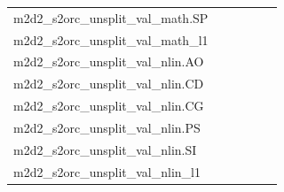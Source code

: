 \documentclass[dvipsnames]{article}
\begin{document}
\begin{appendix}
{\begin{longtable}{m{6cm}m{1.7cm}m{1.7cm}m{1.7cm}m{1.7cm}m{1.7cm}}
	m2d2\_s2orc\_unsplit\_val\_math.SP  & \colorbox[HTML]{86cc7e}{\makebox[\mywidth][c]{9.39}} & \colorbox[HTML]{def2a6}{\makebox[\mywidth][c]{9.65}} & \colorbox[HTML]{ffffe5}{\makebox[\mywidth][c]{11.27}} & \colorbox[HTML]{bbe395}{\makebox[\mywidth][c]{9.52}} & \colorbox[HTML]{77c578}{\makebox[\mywidth][c]{9.37}}\\
	m2d2\_s2orc\_unsplit\_val\_math\_l1  & \colorbox[HTML]{77c578}{\makebox[\mywidth][c]{7.81}} & \colorbox[HTML]{e5f4ab}{\makebox[\mywidth][c]{8.07}} & \colorbox[HTML]{ffffe5}{\makebox[\mywidth][c]{9.36}} & \colorbox[HTML]{d0ec9e}{\makebox[\mywidth][c]{7.99}} & \colorbox[HTML]{9ad486}{\makebox[\mywidth][c]{7.87}}\\
	m2d2\_s2orc\_unsplit\_val\_nlin.AO  & \colorbox[HTML]{9bd587}{\makebox[\mywidth][c]{11.82}} & \colorbox[HTML]{d8efa2}{\makebox[\mywidth][c]{12.01}} & \colorbox[HTML]{ffffe5}{\makebox[\mywidth][c]{13.77}} & \colorbox[HTML]{bbe395}{\makebox[\mywidth][c]{11.90}} & \colorbox[HTML]{77c578}{\makebox[\mywidth][c]{11.75}}\\
	m2d2\_s2orc\_unsplit\_val\_nlin.CD  & \colorbox[HTML]{addd8e}{\makebox[\mywidth][c]{12.73}} & \colorbox[HTML]{dbf1a4}{\makebox[\mywidth][c]{12.91}} & \colorbox[HTML]{ffffe5}{\makebox[\mywidth][c]{14.88}} & \colorbox[HTML]{d3eda0}{\makebox[\mywidth][c]{12.87}} & \colorbox[HTML]{77c578}{\makebox[\mywidth][c]{12.60}}\\
	m2d2\_s2orc\_unsplit\_val\_nlin.CG  & \colorbox[HTML]{77c578}{\makebox[\mywidth][c]{12.43}} & \colorbox[HTML]{d9f0a3}{\makebox[\mywidth][c]{12.75}} & \colorbox[HTML]{ffffe5}{\makebox[\mywidth][c]{14.88}} & \colorbox[HTML]{b8e293}{\makebox[\mywidth][c]{12.61}} & \colorbox[HTML]{7cc77a}{\makebox[\mywidth][c]{12.44}}\\
	m2d2\_s2orc\_unsplit\_val\_nlin.PS  & \colorbox[HTML]{a2d889}{\makebox[\mywidth][c]{11.29}} & \colorbox[HTML]{d9f0a3}{\makebox[\mywidth][c]{11.44}} & \colorbox[HTML]{ffffe5}{\makebox[\mywidth][c]{12.86}} & \colorbox[HTML]{c9e99b}{\makebox[\mywidth][c]{11.39}} & \colorbox[HTML]{77c578}{\makebox[\mywidth][c]{11.22}}\\
	m2d2\_s2orc\_unsplit\_val\_nlin.SI  & \colorbox[HTML]{77c578}{\makebox[\mywidth][c]{9.44}} & \colorbox[HTML]{eef8b2}{\makebox[\mywidth][c]{9.81}} & \colorbox[HTML]{ffffe5}{\makebox[\mywidth][c]{11.28}} & \colorbox[HTML]{ceeb9e}{\makebox[\mywidth][c]{9.64}} & \colorbox[HTML]{9bd587}{\makebox[\mywidth][c]{9.51}}\\
	m2d2\_s2orc\_unsplit\_val\_nlin\_l1  & \colorbox[HTML]{77c578}{\makebox[\mywidth][c]{12.43}} & \colorbox[HTML]{d9f0a3}{\makebox[\mywidth][c]{12.75}} & \colorbox[HTML]{ffffe5}{\makebox[\mywidth][c]{14.88}} & \colorbox[HTML]{b8e293}{\makebox[\mywidth][c]{12.61}} & \colorbox[HTML]{7cc77a}{\makebox[\mywidth][c]{12.44}}\\

\end{longtable}}
\end{appendix}
\end{document}

